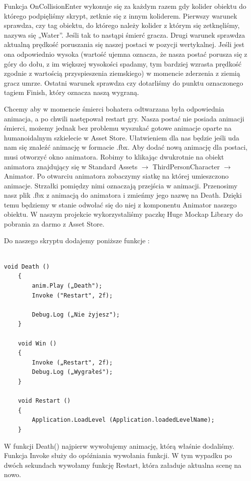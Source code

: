 \documentclass[openright]{xmgr}
\begin{document}
Funkcja OnCollisionEnter wykonuje się za każdym razem gdy kolider obiektu do którego podpięliśmy skrypt, zetknie się z innym koliderem. Pierwszy warunek sprawdza, czy tag obiektu, do którego należy kolider z którym się zetknęliśmy, nazywa się „Water”. Jeśli tak to nastąpi śmierć gracza. Drugi warunek sprawdza aktualną prędkość poruszania się naszej postaci w pozycji wertykalnej. Jeśli jest ona odpowiednio wysoka (wartość ujemna oznacza, że nasza postać porusza się z góry do dołu, z im większej wysokości spadamy, tym bardziej wzrasta prędkość zgodnie z wartością przyspieszenia ziemskiego) w momencie zderzenia z ziemią gracz umrze. Ostatni warunek sprawdza czy dotarliśmy do punktu oznaczonego tagiem Finish, który oznacza naszą wygraną.

Chcemy aby w momencie śmierci bohatera odtwarzana była odpowiednia animacja, a po chwili następował restart gry. Nasza postać nie posiada animacji śmierci, możemy jednak bez problemu wyszukać gotowe animacje oparte na humanoidalnym szkielecie w Asset Store. Ułatwieniem dla nas będzie jeśli uda nam się znaleźć animację w formacie .fbx. Aby dodać nową animację dla postaci, musi otworzyć okno animatora. Robimy to klikając dwukrotnie na obiekt animatora znajdujący się w Standard Assets $\rightarrow$ ThirdPersonCharacter $\rightarrow$ Animator. Po otwarciu animatora zobaczymy siatkę na której umieszczono animacje. Strzałki pomiędzy nimi oznaczają przejścia w animacji. Przenosimy nasz plik .fbx z animacją do animatora i zmieńmy jego nazwę na Death. Dzięki temu będziemy w stanie odwołać się do niej z komponentu Animator naszego obiektu.
W naszym projekcie wykorzystaliśmy paczkę Huge Mockap Library do pobrania za darmo z Asset Store.

Do naszego skryptu dodajemy poniższe funkcje :

\begin{lstlisting}

void Death ()
    {
        anim.Play („Death");
        Invoke ("Restart", 2f);

        Debug.Log („Nie żyjesz");
    }

    void Win ()
    {
        Invoke („Restart", 2f);
        Debug.Log („Wygrałeś");
    }

    void Restart ()
    {
        Application.LoadLevel (Application.loadedLevelName);
    }

\end{lstlisting}

W funkcji Death() najpierw wywołujemy animację, którą właśnie dodaliśmy.
Funkcja Invoke służy do opóźniania wywołania funkcji. W tym wypadku po dwóch sekundach wywołamy funkcję Restart, która załaduje aktualna scenę na nowo.
\end{document}
